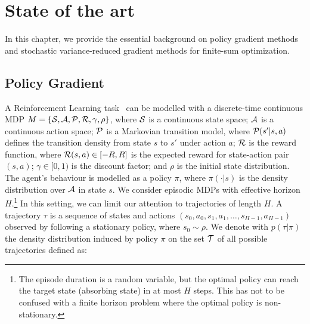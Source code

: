 \chapter{State of the art}\label{chap:art}

\vspace{-0.05in}
In this chapter, we provide the essential background on policy gradient methods and stochastic variance-reduced gradient methods for finite-sum optimization.
\vspace{-0.05in}

\section{Policy Gradient}\label{sec:PolicyGradient}
\vspace{-0.05in}
A Reinforcement Learning task~\citep{sutton1998reinforcement} can be modelled with a discrete-time continuous \acs{MDP} $M = \{\mathcal{S},\mathcal{A},\mathcal{P},\mathcal{R},\gamma,\rho\}$, where $\mathcal{S}$ is a continuous state space; $\mathcal{A}$ is a continuous action space; $\mathcal{P}$ is a Markovian transition model, where $\mathcal{P}(s'|s,a)$ defines the transition density from state $s$ to $s'$ under action $a$; $\mathcal{R}$ is the reward function, where $\mathcal{R}(s,a) \in [-R,R]$ is the expected reward for state-action pair $(s,a)$;
$\gamma\in[0,1)$ is the discount factor; and $\rho$ is the initial state distribution.
The agent's behaviour is modelled as a policy $\pi$, where $\pi(\cdot|s)$ is the density distribution over $\mathcal{A}$ in state $s$.
We consider episodic \acs{MDP}s with effective horizon $H$.\footnote{The episode duration is a random variable, but the optimal policy can reach the target state (\ie absorbing state) in at most $H$ steps. This has not to be confused with a finite horizon problem where the optimal policy is non-stationary.} In this setting, we can limit our attention to trajectories of length $H$. A trajectory $\tau$ is a sequence of states and actions $(s_0,a_0,s_1,a_1,\dots,s_{H-1},a_{H-1})$ observed by following a stationary policy, where $s_0 \sim \rho$.
We denote with $p(\tau|\pi)$ the density distribution induced by policy $\pi$ on the set $\mathcal{T}$ of all possible trajectories defined as:

